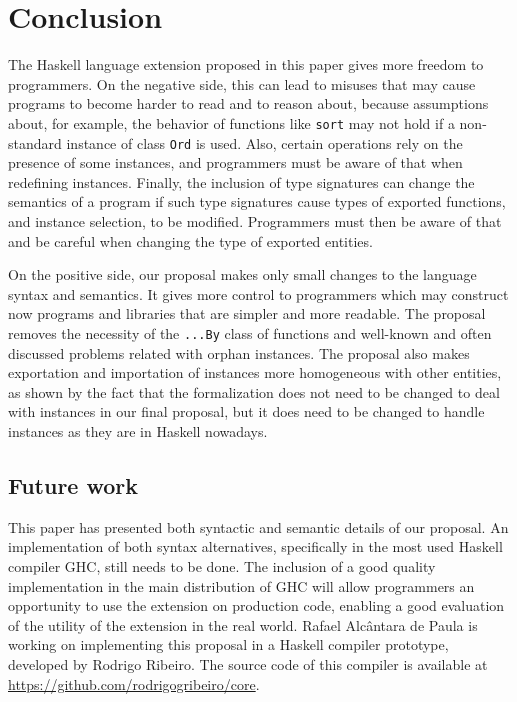 \documentclass[msc]{ppgccufmg}
\begin{document}
\chapter{Conclusion}

The Haskell language extension proposed in this paper gives more
freedom to programmers. On the negative side, this can lead to misuses
that may cause programs to become harder to read and to reason about,
because assumptions about, for example, the behavior of functions like
\texttt{sort} may not hold if a non-standard instance of class
\texttt{Ord} is used.
Also, certain operations rely on the presence of some instances, and
programmers must be aware of that when redefining instances.  Finally,
the inclusion of type signatures can change the semantics of a program
if such type signatures cause types of exported functions, and
instance selection, to be modified. Programmers must then be aware of
that and be careful when changing the type of exported entities.

On the positive side, our proposal makes only small changes to the
language syntax and semantics. It gives more control to programmers
which may construct now programs and libraries that are simpler and
more readable.  The proposal removes the necessity of the
\texttt{...By} class of functions and well-known and often discussed
problems related with orphan instances. The proposal also makes
exportation and importation of instances more homogeneous with other
entities, as shown by the fact that the formalization does not need to
be changed to deal with instances in our final proposal, but it does
need to be changed to handle instances as they are in Haskell
nowadays.

\section{Future work}
This paper has presented both syntactic and semantic details of our
proposal. An implementation of both syntax alternatives, specifically in
the most used Haskell compiler GHC, still needs to be done. The
inclusion of a good quality implementation in the main distribution of
GHC will allow programmers an opportunity to use the extension on
production code, enabling a good evaluation of the utility of the
extension in the real world.  Rafael Alcântara de Paula is working on
implementing this proposal in
a Haskell compiler prototype, developed by Rodrigo Ribeiro. The source
code of this compiler is available at
\url{https://github.com/rodrigogribeiro/core}.

\end{document}
